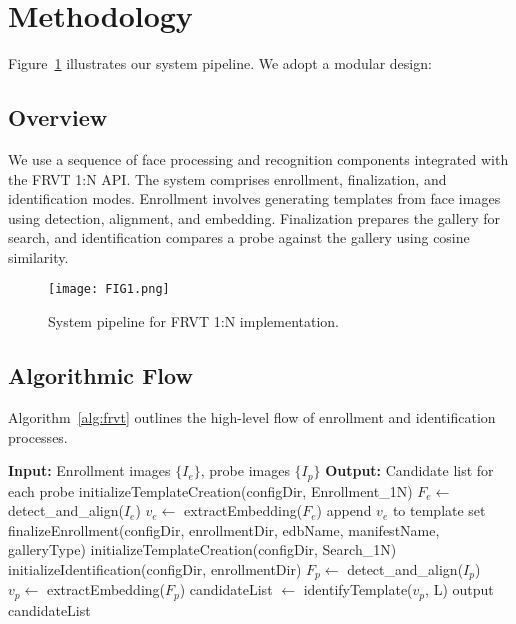 \documentclass[conference]{IEEEtran}
\begin{document}
\section{Methodology}
Figure~\ref{fig:pipeline} illustrates our system pipeline. We adopt a modular design:

\subsection{Overview}
We use a sequence of face processing and recognition components integrated with the FRVT 1:N API. The system comprises enrollment, finalization, and identification modes. Enrollment involves generating templates from face images using detection, alignment, and embedding. Finalization prepares the gallery for search, and identification compares a probe against the gallery using cosine similarity.

\begin{figure}[htbp]
  \centering
  \texttt{[image: FIG1.png]}
  \caption{System pipeline for FRVT 1:N implementation.}
  \label{fig:pipeline}
\end{figure}

\subsection{Algorithmic Flow}
Algorithm~\ref{alg:frvt} outlines the high-level flow of enrollment and identification processes.

\begin{algorithm}[htbp]
\caption{FRVT 1:N Recognition Pipeline}
\label{alg:frvt}
\begin{algorithmic}[1]
  \STATE \textbf{Input:} Enrollment images $\{I_e\}$, probe images $\{I_p\}$
  \STATE \textbf{Output:} Candidate list for each probe
  \STATE initializeTemplateCreation(configDir, Enrollment_1N)
    \STATE $F_e \leftarrow$ detect\_and\_align($I_e$)
    \STATE $v_e \leftarrow$ extractEmbedding($F_e$)
    \STATE append $v_e$ to template set
  \ENDFOR
  \STATE finalizeEnrollment(configDir, enrollmentDir, edbName, manifestName, galleryType)
  \STATE initializeTemplateCreation(configDir, Search_1N)
  \STATE initializeIdentification(configDir, enrollmentDir)
    \STATE $F_p \leftarrow$ detect\_and\_align($I_p$)
    \STATE $v_p \leftarrow$ extractEmbedding($F_p$)
    \STATE candidateList $\leftarrow$ identifyTemplate($v_p$, L)
    \STATE output candidateList
  \ENDFOR
\end{algorithmic}
\end{algorithm}
\end{document}
